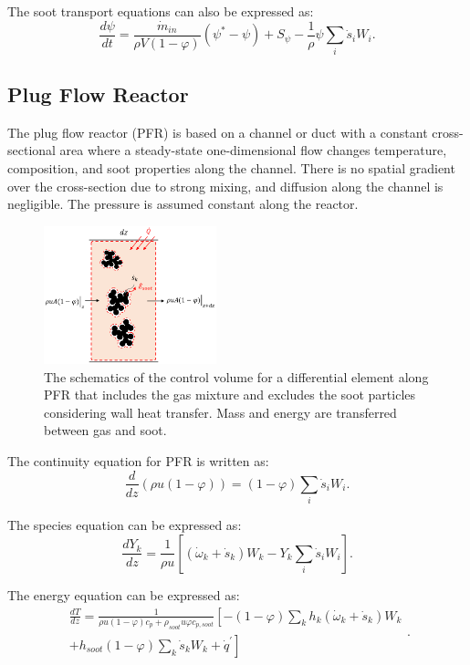 The soot transport equations can also be expressed as:
\begin{equation}
	\frac{d\psi}{dt}
	=
	\frac{{\dot{m}}_{in}}{\rho V
	\left(1-\varphi\right)}
	\left(\psi^\ast-\psi\right)
	+
	S_{\psi}
	-\frac{1}{\rho}\psi\sum_{i}{{\dot{s}}_i W_i}
	\label{eqn:sootpsr}.
\end{equation}

\subsection{Plug Flow Reactor}
The plug flow reactor (PFR) is based on a channel or duct with a constant cross-sectional area where a steady-state one-dimensional flow changes temperature, composition, and soot properties along the channel. There is no spatial gradient over the cross-section due to strong mixing, and  diffusion along the channel is negligible. The pressure is assumed constant along the reactor.
\begin{figure}[!htbp]
	\centering
	\includegraphics[height=40mm, ]{Figures/Theory/PFR.pdf}
	\caption{The schematics of the control volume for a differential element along PFR that includes the gas mixture and excludes the soot particles considering wall heat transfer. Mass and energy are transferred between gas and soot.}
	\label{fig:pfrcv}
\end{figure}

 

The continuity equation for PFR is written as:
\begin{equation}
	\frac{d}{dz}(\rho u(1-\varphi)) =(1-\varphi) \sum_i \dot s_i W_i
	\label{eqn:contpfr}.
\end{equation}

The species equation can be expressed as:
\begin{equation}
	\frac{d Y_k}{d z}=\frac{1}{\rho u}\left[\left(\dot{\omega}_k+\dot{s}_k\right) W_k-Y_k \sum_i \dot{s}_i W_i\right]
	\label{eqn:speciespfr}.
\end{equation}

The energy equation can be expressed as:
\begin{equation}
	\begin{split}
		\frac{d T}{d z}=
		\frac{1}{\rho u (1-\varphi) c_p+\rho_{soot} u \varphi 	c_{p,soot}}
		\left[
			-(1-\varphi)\sum_k h_k
			\left(
			\dot{\omega}_k+\dot{s}_k
			\right) W_k
		\right. \\
		\left.
			+h_{soot}(1-\varphi)\sum_k \dot{s}_k W_k
			+\dot{q}^\prime
		\right]
	\end{split}
	\label{eqn:energypfr}.
\end{equation}

